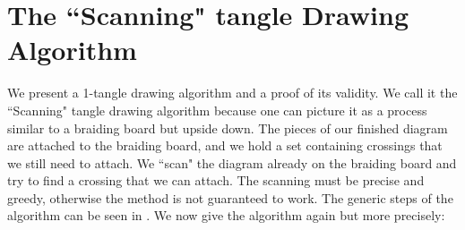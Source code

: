 \section{The ``Scanning" tangle Drawing Algorithm}

We present a 1-tangle drawing algorithm and a proof of its validity. We call it the ``Scanning" tangle drawing algorithm because one can picture it as a process similar to a braiding board but upside down. The pieces of our finished diagram are attached to the braiding board, and we hold a set containing crossings that we still need to attach. We ``scan" the diagram already on the braiding board and try to find a crossing that we can attach. The scanning must be precise and greedy, otherwise the method is not guaranteed to work. The generic steps of the algorithm can be seen in . We now give the algorithm again but more precisely:

